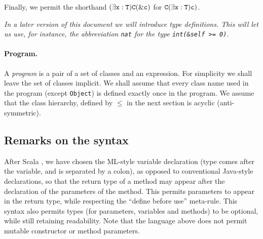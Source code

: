 \documentclass{article}
\begin{document}
Finally, we permit the shorthand $\tt (\exists x:T) C(\&c)$ for
$\tt C(\exists x:T)c)$.

{\em In a later version of this document we will introduce type definitions.
This will let us use, for instance, the abbreviation {\tt nat}
for the type {\tt int(\&self >= 0)}. 
}

\paragraph{Program.}
A {\em program} is a pair of a set of classes and an expression. For
simplicity we shall leave the set of classes implicit. We shall assume
that every class name used in the program (except {\tt Object}) is
defined exactly once in the program. We assume that the class
hierarchy, defined by $\leq$ in the next section is acyclic
(anti-symmetric).

\subsection{Remarks on the syntax}


After Scala \cite{scala}, we have chosen the ML-style variable
declaration (type comes after the variable, and is separated by a
colon), as opposed to conventional Java-style declarations, so that
the return type of a method may appear after the declaration of the
parameters of the method. This permits parameters to appear in the
return type, while respecting the ``define before use''
meta-rule. This syntax also permits types (for parameters, variables
and methods) to be optional, while still retaining readability.  Note
that the language above does not permit mutable constructor or method
parameters.
\end{document}

